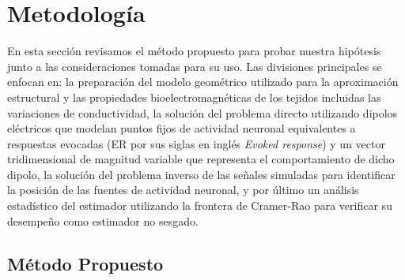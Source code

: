 %
\chapter{Metodología}

\label{sec:methodology}

En esta sección revisamos el método propuesto para probar nuestra hipótesis junto a las consideraciones tomadas para su uso. Las divisiones principales se enfocan en: la preparación del modelo geométrico utilizado para la aproximación estructural y las propiedades bioelectromagnéticas de los tejidos incluidas las variaciones de conductividad, la solución del problema directo utilizando dipolos eléctricos que modelan puntos fijos de actividad neuronal equivalentes a respuestas evocadas (ER por sus siglas en inglés \emph{Evoked response}) y un vector tridimensional de magnitud variable que representa el comportamiento de dicho dipolo, la solución del problema inverso de las señales simuladas para identificar la posición de las fuentes de actividad neuronal, y por último un análisis estadístico del estimador utilizando la frontera de Cramer-Rao para verificar su desempeño como estimador no sesgado.

\section{Método Propuesto}
\label{sec:methodology:method}

